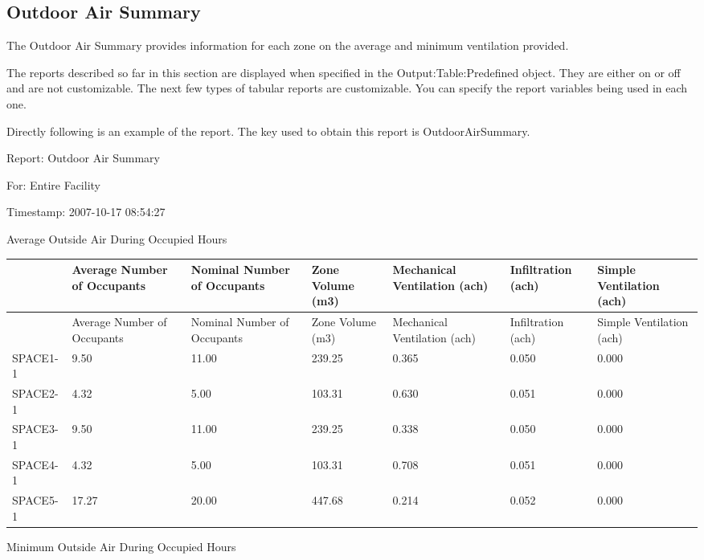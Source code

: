 \subsection{Outdoor Air Summary}\label{outdoor-air-summary}

The Outdoor Air Summary provides information for each zone on the average and minimum ventilation provided.

The reports described so far in this section are displayed when specified in the Output:Table:Predefined object. They are either on or off and are not customizable. The next few types of tabular reports are customizable. You can specify the report variables being used in each one.

Directly following is an example of the report. The key used to obtain this report is OutdoorAirSummary.

Report: Outdoor Air Summary

For: Entire Facility

Timestamp: 2007-10-17 08:54:27

Average Outside Air During Occupied Hours

\begin{longtable}[c]{>{\raggedright}p{0.85in}>{\raggedright}p{0.85in}>{\raggedright}p{0.85in}>{\raggedright}p{0.85in}>{\raggedright}p{0.85in}>{\raggedright}p{0.85in}>{\raggedright}p{0.85in}}
\toprule 
~ & Average Number of Occupants & Nominal Number of Occupants & Zone Volume (m3) & Mechanical Ventilation (ach) & Infiltration (ach) & Simple Ventilation (ach) \tabularnewline
\midrule
\endfirsthead

\toprule 
~ & Average Number of Occupants & Nominal Number of Occupants & Zone Volume (m3) & Mechanical Ventilation (ach) & Infiltration (ach) & Simple Ventilation (ach) \tabularnewline
\midrule
\endhead

SPACE1-1 & 9.50 & 11.00 & 239.25 & 0.365 & 0.050 & 0.000 \tabularnewline
SPACE2-1 & 4.32 & 5.00 & 103.31 & 0.630 & 0.051 & 0.000 \tabularnewline
SPACE3-1 & 9.50 & 11.00 & 239.25 & 0.338 & 0.050 & 0.000 \tabularnewline
SPACE4-1 & 4.32 & 5.00 & 103.31 & 0.708 & 0.051 & 0.000 \tabularnewline
SPACE5-1 & 17.27 & 20.00 & 447.68 & 0.214 & 0.052 & 0.000 \tabularnewline
\bottomrule
\end{longtable}

Minimum Outside Air During Occupied Hours

